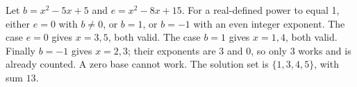 Let $b=x^2-5x+5$ and $e=x^2-8x+15$. For a real-defined power to equal 1, either $e=0$ with $b\ne0$, or $b=1$, or $b=-1$ with an even integer exponent. The case $e=0$ gives $x=3,5$, both valid. The case $b=1$ gives $x=1,4$, both valid. Finally $b=-1$ gives $x=2,3$; their exponents are 3 and 0, so only 3 works and is already counted. A zero base cannot work. The solution set is $\{1,3,4,5\}$, with sum $\boxed{13}$.
